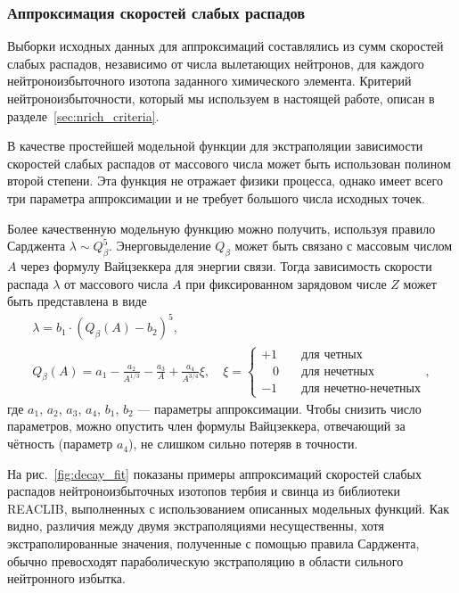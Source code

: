 \subsubsection{Аппроксимация скоростей слабых распадов}
  Выборки исходных данных для аппроксимаций составлялись из сумм скоростей слабых распадов, независимо от числа вылетающих нейтронов, для каждого нейтроноизбыточного изотопа заданного химического элемента. Критерий нейтроноизбыточности, который мы используем в настоящей работе, описан в разделе~\ref{sec:nrich_criteria}.
  
  В качестве простейшей модельной функции для экстраполяции зависимости скоростей слабых распадов от массового числа может быть использован полином второй степени. Эта функция не отражает физики процесса, однако имеет всего три параметра аппроксимации и не требует большого числа исходных точек. 

  Более качественную модельную функцию можно получить, используя правило Сарджента $\lambda \sim Q_\beta^5$. Энерговыделение $Q_\beta$ может быть связано с массовым числом $A$ через формулу Вайцзеккера для энергии связи. Тогда зависимость скорости распада $\lambda$ от массового числа $A$ при фиксированном зарядовом числе $Z$ может быть представлена в виде
\begin{equation}
\begin{gathered}
  \displaystyle
  \lambda = b_1 \cdot (Q_\beta(A) - b_2)^5,\\
  Q_\beta(A) = 
  a_1 - \frac{a_2}{A^{1/3}} - \frac{a_3}{A} + \frac{a_4}{A^{3/4}} \xi,
  \quad \xi =
  \begin{cases}
    +1& \quad\text{для четных} \\
    \hspace{11pt}0& \quad\text{для нечетных} \\
    -1& \quad\text{для нечетно-нечетных}
  \end{cases},
\end{gathered}
\end{equation}
где $a_1$, $a_2$, $a_3$, $a_4$, $b_1$, $b_2$ --- параметры аппроксимации. Чтобы снизить число параметров, можно опустить член формулы Вайцзеккера, отвечающий за чётность (параметр $a_4$), не слишком сильно потеряв в точности.

  На рис.~\ref{fig:decay_fit} показаны примеры аппроксимаций скоростей слабых распадов нейтроноизбыточных изотопов тербия и свинца из библиотеки REACLIB, выполненных с использованием описанных модельных функций. Как видно, различия между двумя экстраполяциями несущественны, хотя экстраполированные значения, полученные с помощью правила Сарджента, обычно превосходят параболическую экстраполяцию в области сильного нейтронного избытка.
  
